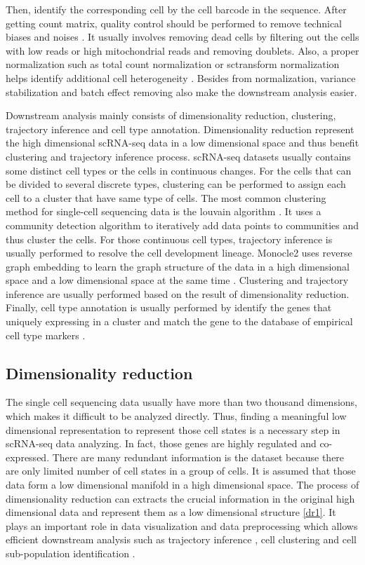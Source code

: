 Then, identify the corresponding cell by the cell barcode in the sequence. After getting count matrix, quality control should be performed to remove technical biases and noises \cite{van2017single}. It usually involves removing dead cells by filtering out the cells with low reads or high mitochondrial reads and removing doublets. Also, a proper normalization such as total count normalization or sctransform normalization helps identify additional cell heterogeneity \cite{vallejos2017normalizing}. Besides from normalization, variance stabilization and batch effect removing also make the downstream analysis easier.

Downstream analysis mainly consists of dimensionality reduction, clustering, trajectory inference and cell type annotation. Dimensionality reduction represent the high dimensional scRNA-seq data in a low dimensional space and thus benefit clustering and trajectory inference process. scRNA-seq datasets usually contains some distinct cell types or the cells in continuous changes. For the cells that can be divided to several discrete types, clustering can be performed to assign each cell to a cluster that have same type of cells. The most common clustering method for single-cell sequencing data is the louvain algorithm \cite{traag2019louvain}. It uses a community detection algorithm to iteratively add data points to communities and thus cluster the cells. For those continuous cell types, trajectory inference is usually performed to resolve the cell development lineage. Monocle2 uses reverse graph embedding to learn the graph structure of the data in a high dimensional space and a low dimensional space at the same time \cite{qiu2017reversed}. Clustering and trajectory inference are usually performed based on the result of dimensionality reduction. Finally, cell type annotation is usually performed by identify the genes that uniquely expressing in a cluster and match the gene to the database of empirical cell type markers \cite{abdelaal2019comparison}. 

\subsection{Dimensionality reduction}

The single cell sequencing data usually have more than two thousand dimensions, which makes it difficult to be analyzed directly. Thus, finding a meaningful low dimensional representation to represent those cell states is a necessary step in scRNA-seq data analyzing. In fact, those genes are highly regulated and co-expressed. There are many redundant information is the dataset because there are only limited number of cell states in a group of cells. It is assumed that those data form a low dimensional manifold in a high dimensional space. The process of dimensionality reduction can extracts the crucial information in the original high dimensional data and represent them as a low dimensional structure \ref{dr1}.  It plays an important role in data visualization and data preprocessing which allows efficient downstream analysis such as trajectory inference \cite{Saelens2019}, cell clustering \cite{weber2016comparison} and cell sub-population identification \cite{Hwang2018}. 

